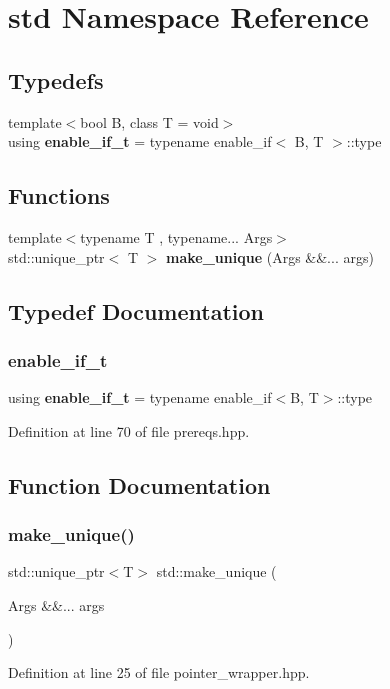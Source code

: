 \section{std Namespace Reference}
\label{namespacestd}
\subsection*{Typedefs}
\begin{DoxyCompactItemize}
\item 
{\footnotesize template$<$bool B, class T  = void$>$ }\\using \textbf{ enable\+\_\+if\+\_\+t} = typename enable\+\_\+if$<$ B, T $>$\+::type
\end{DoxyCompactItemize}
\subsection*{Functions}
\begin{DoxyCompactItemize}
\item 
{\footnotesize template$<$typename T , typename... Args$>$ }\\std\+::unique\+\_\+ptr$<$ T $>$ \textbf{ make\+\_\+unique} (Args \&\&... args)
\end{DoxyCompactItemize}


\subsection{Typedef Documentation}
\mbox{\label{namespacestd_a93e9cb7fadbcfaa2afb5b94058b8e34c}} 
\subsubsection{enable\+\_\+if\+\_\+t}
{\footnotesize\ttfamily using \textbf{ enable\+\_\+if\+\_\+t} =  typename enable\+\_\+if$<$B, T$>$\+::type}



Definition at line 70 of file prereqs.\+hpp.



\subsection{Function Documentation}
\mbox{\label{namespacestd_ac00ab9944702fa0bd9edaa48df3bf164}} 
\subsubsection{make\+\_\+unique()}
{\footnotesize\ttfamily std\+::unique\+\_\+ptr$<$T$>$ std\+::make\+\_\+unique (\begin{DoxyParamCaption}\item[{Args \&\&...}]{args }\end{DoxyParamCaption})}



Definition at line 25 of file pointer\+\_\+wrapper.\+hpp.

